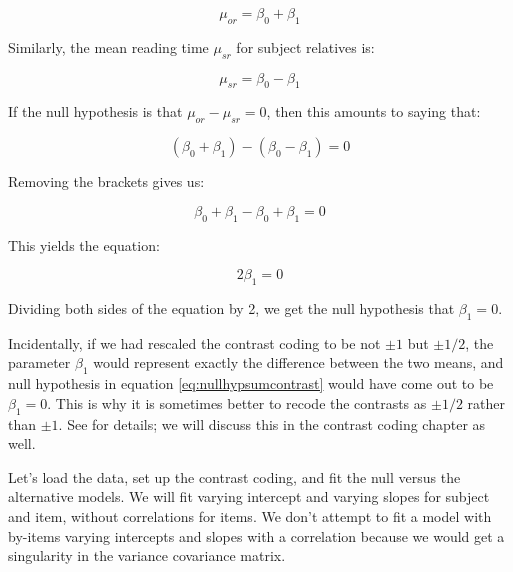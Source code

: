 \documentclass[
  12pt,
]{krantz}
\theoremstyle{definition}
\theoremstyle{definition}
\theoremstyle{definition}
\theoremstyle{definition}
\theoremstyle{remark}
\begin{document}
\begin{equation}
\mu_{or}=\beta_0 + \beta_1
\end{equation}

Similarly, the mean reading time \(\mu_{sr}\) for subject relatives is:

\begin{equation}
\mu_{sr}=\beta_0 - \beta_1
\end{equation}

If the null hypothesis is that \(\mu_{or}-\mu_{sr}=0\), then this amounts to saying that:

\begin{equation}
(\beta_0 + \beta_1)-(\beta_0 - \beta_1)=0
\end{equation}

Removing the brackets gives us:

\begin{equation}
\beta_0 + \beta_1-\beta_0 + \beta_1 = 0
\end{equation}

This yields the equation:

\begin{equation}
2\beta_1= 0
\label{eq:nullhypsumcontrast}
\end{equation}

Dividing both sides of the equation by 2, we get the null hypothesis that \(\beta_1=0\).

Incidentally, if we had rescaled the contrast coding to be not \(\pm 1\) but \(\pm 1/2\), the parameter \(\beta_1\) would represent exactly the difference between the two means, and null hypothesis in equation \eqref{eq:nullhypsumcontrast} would have come out to be \(\beta_1= 0\). This is why it is sometimes better to recode the contrasts as \(\pm 1/2\) rather than \(\pm 1\). See \citet{SchadEtAlcontrasts} for details; we will discuss this in the contrast coding chapter as well.

Let's load the data, set up the contrast coding, and fit the null versus the alternative models. We will fit varying intercept and varying slopes for subject and item, without correlations for items. We don't attempt to fit a model with by-items varying intercepts and slopes with a correlation because we would get a singularity in the variance covariance matrix.
\end{document}
